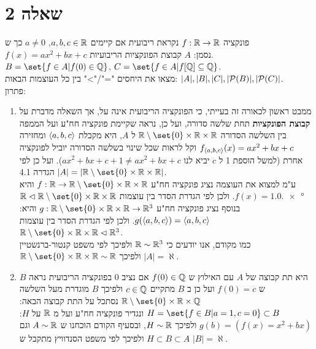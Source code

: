 \documentclass{article}
\DeclarePairedDelimiter\set\{\}
\begin{document}
	\section*{שאלה 2}
	פונקציה $f: \mathbb{R} \to \mathbb{R}$ נקראת ריבועית אם קיימים $a,b,c \in \mathbb{R}$, $a \neq 0$ כך ש  \\
	$f(x) = ax^2 + bx + c$ נסמן:
	$A$ קבוצת הפונקציות הריבועיות.  \\
	$B = \set{f \in A | f(0) \in \QQ}$, $C = \set{f \in A | f[\QQ] \subseteq \QQ}$. \\
	מצאו את היחסים  "="/">" בין כל העוצמות הבאות: $|A|, |B|, |C|, |\mathcal{P}(B)|, |\mathcal{P}(C)|$. \\
	פתרון:
	\begin{enumerate}
		\item ממבט ראשון לכאורה זה בעייתי, כי הפונקציה הריבועית אינה על, אך השאלה מדברת על \textbf{קבוצת הפונקציות} תחת שלשה סדורה,
		ועל כן, נראה שקיימת פונקציה חח"ע ועל הממפה בין השלשה הסדורה $\RR\sub\set{0}\times \RR \times \RR$ ל $A$,
		היא מקבלת $\langle a,b,c \rangle$ ומחזירה $f_{\langle a,b,c \rangle}(x) = ax^2 + bx + c$ וקל לראות שכל שינוי בשלשה הסדורה יוביל לפונקציה אחרת (למשל הוספת 1 ל $c$ יביא לנו $ax^2 + bx + c + 1 \neq ax^2 + bx + c$).
		ועל כן לפי הגדרה 4.1 $|A| = |\RR\sub\set{0}\times \RR \times \RR|$. \\
		ע"מ למצוא את העוצמה נציג פונקציה חח"ע $f : \RR \to \RR\sub\set{0}\times \RR \times \RR$ והיא $f(x) = \ang{1,0,x}$.
		ולכן לפי הגדרת הסדר בין עוצמות $\RR \vartriangleleft \RR\sub\set{0}\times \RR \times \RR$
		בנוסף נציג פונקציה חח"ע $g: \RR\sub\set{0}\times \RR \times \RR \to \RR^3$ והיא: $g(\langle a,b,c \rangle) = \langle a,b,c \rangle$.
		ולכן לפי הגדרת הסדר בין עוצמות $\RR\sub\set{0}\times \RR \times \RR \vartriangleleft \RR^3$. \\
		כמו מקודם, אנו יודעים כי $\mathbb{R} \sim \mathbb{R}^3$ ולפיכך לפי משפט קנטור-ברנשטיין \\
		$\RR\sub\set{0}\times \RR \times \RR \sim \RR$
		ולפיכך $|A| = \aleph$.
		\item $B$ היא תת קבוצה של $A$ עם האילוץ ש $f(0) \in \mathbb{Q}$ אם נציב 0 בפונקציה הריבועית נראה ש $f(0) = c$
		ועל כן ב $B$ מתקיים $c \in \mathbb{Q}$ ולפיכך $B$ מוגדרת מעל השלשה $\RR\sub\set{0} \times \RR \times \QQ$
		נסתכל על התת קבוצה הבאה: $H = \set{ f \in B| a = 1, c = 0} \subset B$ ונגדיר פונקציה חח"ע ועל מ $\mathbb{R}$ על $H$:
		$g(b) = (f(x) = x^2 + bx)$ ולפיכך $H \sim \mathbb{R}$, ובסעיף הקודם הוכחנו ש $A \sim \mathbb{R}$ וגם $H \subset B \subset A$ ולפיכך לפי משפט הסנדוויץ מתקבל ש $|B| = \aleph$.


\end{enumerate}
\end{document}
